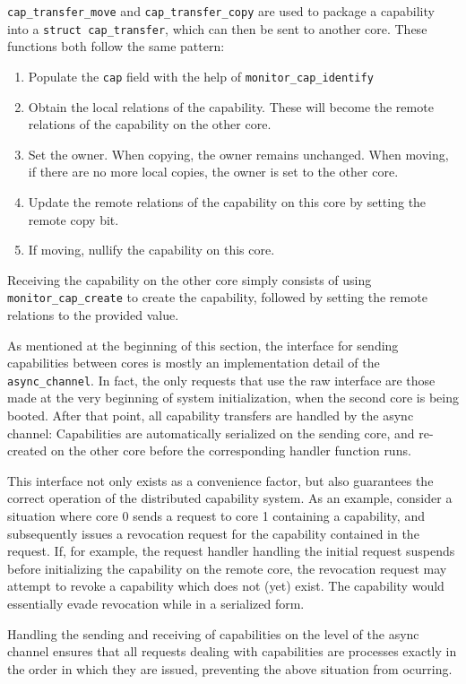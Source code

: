 \texttt{cap\_transfer\_move} and \texttt{cap\_transfer\_copy} are used to package a capability into a \texttt{struct cap\_transfer}, which can then be sent to another core. These functions both follow the same pattern:
\begin{enumerate}
    \item Populate the \texttt{cap} field with the help of \texttt{monitor\_cap\_identify}
    \item Obtain the local relations of the capability. These will become the remote relations of the capability on the other core.
    \item Set the owner. When copying, the owner remains unchanged. When moving, if there are no more local copies, the owner is set to the other core. 
    \item Update the remote relations of the capability on this core by setting the remote copy bit.
    \item If moving, nullify the capability on this core.
\end{enumerate}

Receiving the capability on the other core simply consists of using \texttt{monitor\_cap\_create} to create the capability, followed by setting the remote relations to the provided value.

As mentioned at the beginning of this section, the interface for sending capabilities between cores is mostly an implementation detail of the \texttt{async\_channel}. In fact, the only requests that use the raw interface are those made at the very beginning of system initialization, when the second core is being booted. After that point, all capability transfers are handled by the async channel: Capabilities are automatically serialized on the sending core, and re-created on the other core before the corresponding handler function runs.

This interface not only exists as a convenience factor, but also guarantees the correct operation of the distributed capability system. As an example, consider a situation where core 0 sends a request to core 1 containing a capability, and subsequently issues a revocation request for the capability contained in the request. If, for example, the request handler handling the initial request suspends before initializing the capability on the remote core, the revocation request may attempt to revoke a capability which does not (yet) exist. The capability would essentially evade revocation while in a serialized form.

Handling the sending and receiving of capabilities on the level of the async channel ensures that all requests dealing with capabilities are processes exactly in the order in which they are issued, preventing the above situation from ocurring.

